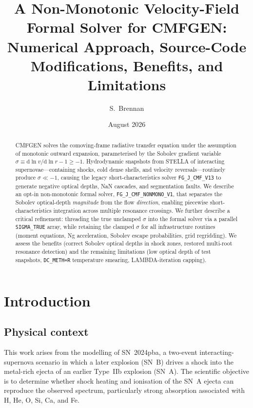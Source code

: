 \documentclass[11pt,a4paper]{article}
\title{A Non-Monotonic Velocity-Field Formal Solver for CMFGEN:\\
Numerical Approach, Source-Code Modifications, Benefits, and Limitations}
\author{S.~Brennan}
\date{August 2026}
\begin{document}
\maketitle

\begin{abstract}
CMFGEN solves the comoving-frame radiative transfer equation under the
assumption of monotonic outward expansion, parameterised by the Sobolev
gradient variable $\sigma \equiv \mathrm{d}\ln v/\mathrm{d}\ln r - 1 \geq -1$.
Hydrodynamic snapshots from STELLA of interacting supernovae---containing
shocks, cold dense shells, and velocity reversals---routinely produce
$\sigma \ll -1$, causing the legacy short-characteristics solver
\texttt{FG\_J\_CMF\_V13} to generate negative optical depths, NaN cascades,
and segmentation faults.  We describe an opt-in non-monotonic formal solver,
\texttt{FG\_J\_CMF\_NONMONO\_V1}, that separates the Sobolev optical-depth
\emph{magnitude} from the flow \emph{direction}, enabling piecewise
short-characteristics integration across multiple resonance crossings.
We further describe a critical refinement: threading the true unclamped
$\sigma$ into the formal solver via a parallel \texttt{SIGMA\_TRUE} array,
while retaining the clamped $\sigma$ for all infrastructure routines
(moment equations, Ng acceleration, Sobolev escape probabilities, grid
regridding).  We assess the benefits (correct Sobolev optical depths in
shock zones, restored multi-root resonance detection) and the remaining
limitations (low optical depth of test snapshots, \texttt{DC\_METH=R}
temperature smearing, LAMBDA-iteration capping).
\end{abstract}

\tableofcontents
\newpage

\section{Introduction}

\subsection{Physical context}

This work arises from the modelling of SN~2024pba, a two-event
interacting-supernova scenario in which a later explosion (SN~B) drives
a shock into the metal-rich ejecta of an earlier Type~IIb explosion
(SN~A).  The scientific objective is to determine whether shock heating
and ionisation of the SN~A ejecta can reproduce the observed spectrum,
particularly strong absorption associated with H, He, O, Si, Ca, and Fe.
\end{document}
